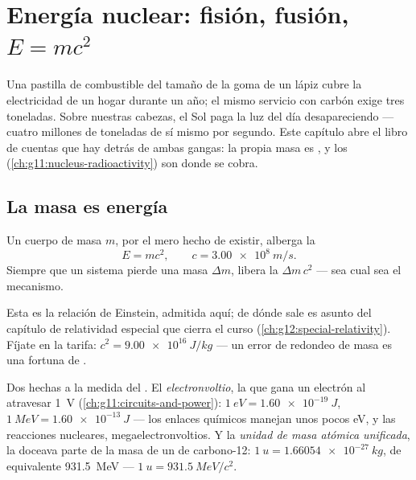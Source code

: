 \chapter{Energía nuclear: fisión, fusión, $E=mc^2$}\label{ch:g12:nuclear-energy}

Una pastilla de combustible del tamaño de la goma de un lápiz cubre la electricidad de
un hogar durante un año; el mismo servicio con carbón exige tres toneladas. Sobre
nuestras cabezas, el Sol paga la luz del día desapareciendo --- cuatro millones de
toneladas de sí mismo por segundo. Este capítulo abre el libro de cuentas que hay
detrás de ambas gangas: la propia masa es , y los 
(\cref{ch:g11:nucleus-radioactivity}) son donde se cobra.

\section{La masa es energía}

\begin{theorem}\label{thm:g12:nuclear-energy:emc2}
Un cuerpo de masa $m$, por el mero hecho de existir, alberga la 
\[
E = m c^2, \qquad c = \qty{3.00e8}{m/s}.
\]
Siempre que un sistema pierde una masa $\Delta m$, libera la 
$\Delta m\, c^2$ --- sea cual sea el mecanismo.
\end{theorem}
\admitted

\begin{remark}[Einstein, 1905]\label{rem:g12:nuclear-energy:einstein}
Esta es la relación de Einstein, admitida aquí; de dónde sale es asunto del capítulo
de relatividad especial que cierra el curso (\cref{ch:g12:special-relativity}).
Fíjate en la tarifa: $c^2 = \qty{9.00e16}{J/kg}$ --- un error de redondeo de masa es
una fortuna de .
\end{remark}

\begin{definition}\label{def:g12:nuclear-energy:units}
Dos  hechas a la medida del . El
\emph{electronvoltio}, la  que gana un electrón al
atravesar \qty{1}{V} (\cref{ch:g11:circuits-and-power}):
$\qty{1}{eV} = \qty{1.60e-19}{J}$, $\qty{1}{MeV} = \qty{1.60e-13}{J}$ --- los enlaces
químicos manejan unos pocos \unit{eV}, y las reacciones nucleares,
megaelectronvoltios. Y la \emph{unidad de masa atómica unificada}, la doceava parte de la masa de un  de carbono-12:
$\qty{1}{u} = \qty{1.66054e-27}{kg}$, de  equivalente \qty{931.5}{MeV} ---
$\qty{1}{u} = \qty{931.5}{MeV}/c^2$.
\end{definition}

